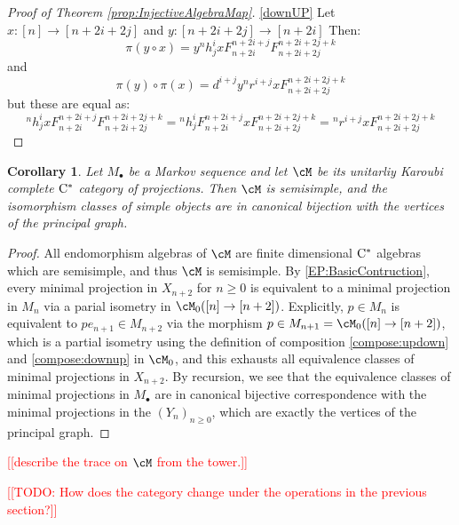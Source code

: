 \documentclass[11pt]{article}
\theoremstyle{plain}
\newtheorem{cor}[thm]{Corollary}
\theoremstyle{definition}
\newcommand{\Cstar}{\rm{C^*}}
\newcommand{\nn}[1]{\textcolor{red}{[[#1]]}}
\begin{document}
\begin{proof}[Proof of Theorem \ref{prop:InjectiveAlgebraMap}]
\eqref{downUP} Let $x:[n]\rightarrow [n+2i+2j]$ and $y:[n+2i+2j]\rightarrow [n+2i]$
Then:
$$
\pi(y\circ x)=y{}^nh^i_jx F^{n+2i+j}_{n+2i} F^{n+2i+2j+k}_{n+2i+2j} 
$$
and
$$
\pi(y)\circ \pi(x)= d^{i+j}y {}^n r^{i+j} x F^{n+2i+2j+k}_{n+2i+2j}
$$
but these are equal as:
$$
{}^nh^i_jx F^{n+2i+j}_{n+2i} F^{n+2i+2j+k}_{n+2i+2j}= {}^nh^i_j F^{n+2i+j}_{n+2i} x F^{n+2i+2j+k}_{n+2i+2j}= {}^n r^{i+j} x F^{n+2i+2j+k}_{n+2i+2j}
$$

\end{proof}

\begin{cor}
\label{cor:SemisimpleProjectionCategory}
Let $M_\bullet$ be a Markov sequence and let $\cM$ be its unitarliy Karoubi complete $\Cstar$ category of projections.
Then $\cM$ is semisimple, and the isomorphism classes of simple objects are in canonical bijection with the vertices of the principal graph.
\end{cor}
\begin{proof}
All endomorphism algebras of $\cM$ are finite dimensional $\Cstar$ algebras which are semisimple, and thus $\cM$ is semisimple. By \ref{EP:BasicContruction}, every minimal projection in $X_{n+2}$ for $n\geq 0$ is equivalent to a minimal projection in $M_{n}$ via a parial isometry in $\cM_0([n] \to [n+2])$. 
Explicitly, $p\in M_n$ is equivalent to $p e_{n+1} \in M_{n+2}$ via the morphism $p\in M_{n+1} = \cM_0([n] \to [n+2])$, which is a partial isometry using the definition of composition \ref{compose:updown} and \ref{compose:downup} in $\cM_0$, and this exhausts all equivalence classes of minimal projections in $X_{n+2}$.
By recursion, we see that the equivalence classes of minimal projections in $M_\bullet$ are in canonical bijective correspondence with the minimal projections in the $(Y_n)_{n\geq 0}$, which are exactly the vertices of the principal graph.
\end{proof}

\nn{describe the trace on $\cM$ from the tower.}

\nn{TODO: How does the category change under the operations in the previous section?}
\end{document}
